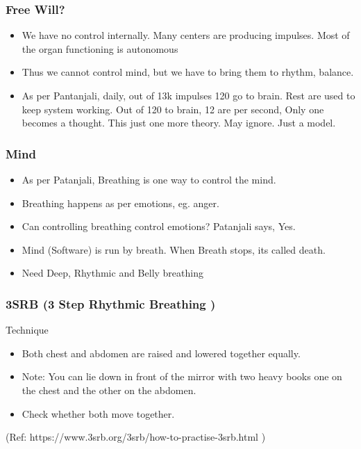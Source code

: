 \begin{frame}[fragile]
\frametitle{Free Will?}

\begin{itemize}
\item We have no control internally. Many centers are producing impulses. Most of the organ functioning is autonomous
\item Thus we cannot control mind, but we have to bring them to rhythm, balance.
\item As per Pantanjali, daily, out of 13k impulses 120 go to brain. Rest are used to keep system working. Out of 120 to brain, 12 are per second, Only one becomes a thought. This just one more theory. May ignore. Just a model.
\end{itemize}
\end{frame}

\begin{frame}[fragile]
\frametitle{Mind}
\begin{itemize}
\item As per Patanjali, Breathing is one way to control the mind.
\item Breathing happens as per emotions, eg. anger.
\item Can controlling breathing control emotions? Patanjali says, Yes.
\item Mind (Software) is run by breath. When Breath stops, its called death.
\item Need Deep, Rhythmic and Belly breathing
\end{itemize}
\end{frame}

\begin{frame}[fragile]
\frametitle{3SRB (3 Step Rhythmic Breathing )}

Technique

\begin{itemize}
\item Both chest and abdomen are raised and lowered together equally.
\item Note: You can lie down in front of the mirror with two heavy books one on the chest and the other on the abdomen. 
\item Check whether both move together.
\end{itemize}

\tiny{(Ref: https://www.3srb.org/3srb/how-to-practise-3srb.html )}
\end{frame}

